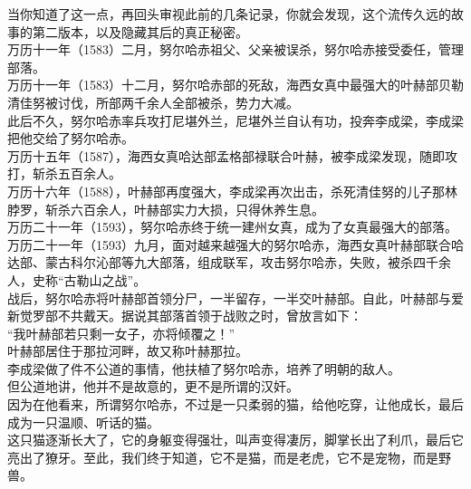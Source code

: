 \begin{multicols}{\theparacolNo}
当你知道了这一点，再回头审视此前的几条记录，你就会发现，这个流传久远的故事的第二版本，以及隐藏其后的真正秘密。\\

万历十一年（1583）二月，努尔哈赤祖父、父亲被误杀，努尔哈赤接受委任，管理部落。\\

万历十一年（1583）十二月，努尔哈赤部的死敌，海西女真中最强大的叶赫部贝勒清佳努被讨伐，所部两千余人全部被杀，势力大减。\\

此后不久，努尔哈赤率兵攻打尼堪外兰，尼堪外兰自认有功，投奔李成梁，李成梁把他交给了努尔哈赤。\\

万历十五年（1587），海西女真哈达部孟格部禄联合叶赫，被李成梁发现，随即攻打，斩杀五百余人。\\

万历十六年（1588），叶赫部再度强大，李成梁再次出击，杀死清佳努的儿子那林脖罗，斩杀六百余人，叶赫部实力大损，只得休养生息。\\

万历二十一年（1593），努尔哈赤终于统一建州女真，成为了女真最强大的部落。\\

万历二十一年（1593）九月，面对越来越强大的努尔哈赤，海西女真叶赫部联合哈达部、蒙古科尔沁部等九大部落，组成联军，攻击努尔哈赤，失败，被杀四千余人，史称“古勒山之战”。\\

战后，努尔哈赤将叶赫部首领分尸，一半留存，一半交叶赫部。自此，叶赫部与爱新觉罗部不共戴天。据说其部落首领于战败之时，曾放言如下：\\

“我叶赫部若只剩一女子，亦将倾覆之！”\\

叶赫部居住于那拉河畔，故又称叶赫那拉。\\

李成梁做了件不公道的事情，他扶植了努尔哈赤，培养了明朝的敌人。\\

但公道地讲，他并不是故意的，更不是所谓的汉奸。\\

因为在他看来，所谓努尔哈赤，不过是一只柔弱的猫，给他吃穿，让他成长，最后成为一只温顺、听话的猫。\\

这只猫逐渐长大了，它的身躯变得强壮，叫声变得凄厉，脚掌长出了利爪，最后它亮出了獠牙。至此，我们终于知道，它不是猫，而是老虎，它不是宠物，而是野兽。\\


\end{multicols}
